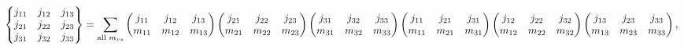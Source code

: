 \[\begin{Bmatrix}j_{11}&j_{12}&j_{13}\\
j_{21}&j_{22}&j_{23}\\
j_{31}&j_{32}&j_{33}\end{Bmatrix}=\sum_{\mbox{\scriptsize all }m_{rs}}\begin{%
pmatrix}j_{11}&j_{12}&j_{13}\\
m_{11}&m_{12}&m_{13}\end{pmatrix}\begin{pmatrix}j_{21}&j_{22}&j_{23}\\
m_{21}&m_{22}&m_{23}\end{pmatrix}\begin{pmatrix}j_{31}&j_{32}&j_{33}\\
m_{31}&m_{32}&m_{33}\end{pmatrix}\*\begin{pmatrix}j_{11}&j_{21}&j_{31}\\
m_{11}&m_{21}&m_{31}\end{pmatrix}\begin{pmatrix}j_{12}&j_{22}&j_{32}\\
m_{12}&m_{22}&m_{32}\end{pmatrix}\begin{pmatrix}j_{13}&j_{23}&j_{33}\\
m_{13}&m_{23}&m_{33}\end{pmatrix},\]